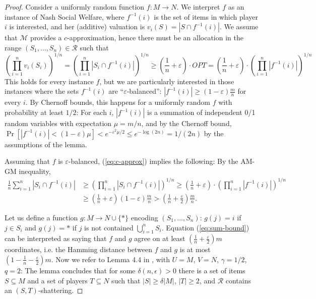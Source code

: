 \documentclass{theoretics}
\newcommand{\eps}{\varepsilon}
\newcommand{\cM}{{\mathcal M}}
\newcommand{\cR}{{\mathcal R}}
\begin{document}
\begin{proof}
Consider a uniformly random function $f:M \to N$. We interpret $f$ as an instance of Nash Social Welfare, where $f^{-1}(i)$ is the set of items in which player $i$ is interested, and her (additive) valuation is $v_i(S) = |S \cap f^{-1}(i)|$. 
We assume that $\cM$ provides a $c$-approximation, hence there must be an allocation in the range $(S_1,\ldots,S_n) \in \cR$ such that
\begin{equation}
\label{eq:c-approx}
 \left( \prod_{i=1}^{n} v_i(S_i) \right)^{1/n} = \left( \prod_{i=1}^{n} |S_i \cap f^{-1}(i)| \right)^{1/n}
 \geq \left( \frac{1}{n} + \eps \right) \cdot OPT = \left( \frac{1}{n} + \eps \right) \cdot \left( \prod_{i=1}^{n} |f^{-1}(i)| \right)^{1/n}
\end{equation}
This holds for every instance $f$, but we are particularly interested in those instances where the sets $f^{-1}(i)$ are ``$\eps$-balanced'': $|f^{-1}(i)| \geq (1-\eps) \frac{m}{n}$ for every $i$. By Chernoff bounds, this happens for a uniformly random $f$ with probability at least $1/2$:
For each $i$, $|f^{-1}(i)|$ is a summation of independent 0/1 random variables with expectation $\mu = m/n$, and by the Chernoff bound, $\Pr[|f^{-1}(i)| < (1-\eps) \mu] < e^{-\eps^2 \mu / 2} \leq e^{-\log (2n)} = 1/(2n)$ by the assumptions of the lemma.

Assuming that $f$ is $\eps$-balanced, (\ref{eq:c-approx}) implies the following: By the AM-GM inequality,
\begin{align}
\label{eq:sum-bound}
\frac{1}{n} \sum_{i=1}^{n} |S_i \cap f^{-1}(i)| &\geq  \left( \prod_{i=1}^{n} |S_i \cap f^{-1}(i)| \right)^{1/n}
 \geq \left( \frac{1}{n} + \eps \right) \cdot \left( \prod_{i=1}^{n} |f^{-1}(i)| \right)^{1/n}\nonumber \\
  &\geq   \left( \frac{1}{n} + \eps \right) (1-\eps) \frac{m}{n} > \left( \frac{1}{n} + \frac{\eps}{2} \right) \frac{m}{n}.
\end{align}

Let us define a function $g:M \to N \cup \{*\}$ encoding $(S_1,\ldots,S_n)$: $g(j) = i$ if $j \in S_i$ and $g(j) = *$ if $j$ is not contained $\bigcup_{i=1}^{n} S_i$. Equation (\ref{eq:sum-bound}) can be interpreted as saying that $f$ and $g$ agree on at least $\left( \frac{1}{n} + \frac{\eps}{2} \right) m$ coordinates, i.e. the Hamming distance between $f$ and $g$ is at most $(1 - \frac{1}{n} - \frac{\eps}{2}) m$. Now we refer to Lemma 4.4 in \cite{BDFK10}, with $U=M$, $V=N$, $\gamma = 1/2$, $q=2$:  The lemma concludes that for some $\delta(n,\epsilon)>0$ there is a set of items $S \subseteq M$ and a set of players $T \subseteq N$ such that $|S| \geq \delta |M|$, $|T| \geq 2$, and $\cR$ contains an $(S,T)$-shattering.
\end{proof}
\end{document}
